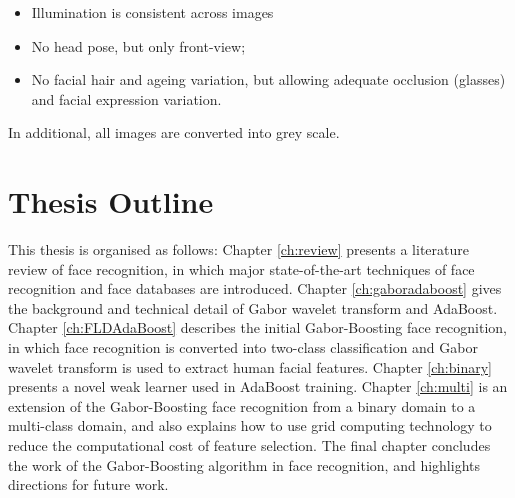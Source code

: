 \begin{itemize}
 \item Illumination is consistent across images
 \item No head pose, but only front-view;
 \item No facial hair and ageing variation, but allowing adequate occlusion (glasses) and facial expression variation.
\end{itemize}
In additional, all images are converted into grey scale.

\section{Thesis Outline}
This thesis is organised as follows: \mbox{Chapter} \ref{ch:review} presents a literature review of face recognition, in which major state-of-the-art techniques of face recognition and face databases are introduced. \mbox{Chapter} \ref{ch:gaboradaboost} gives the background and technical detail of Gabor wavelet transform and AdaBoost. \mbox{Chapter} \ref{ch:FLDAdaBoost} describes the initial Gabor-Boosting face recognition, in which face recognition is converted into two-class classification and Gabor wavelet transform is used to extract human facial features. \mbox{Chapter} \ref{ch:binary} presents a novel weak learner used in AdaBoost training. \mbox{Chapter} \ref{ch:multi} is an extension of the Gabor-Boosting face recognition from a binary domain to a multi-class domain, and also explains how to use grid computing technology to reduce the computational cost of feature selection. The final chapter concludes the work of the Gabor-Boosting algorithm in face recognition, and highlights directions for future work.